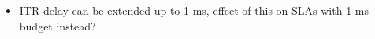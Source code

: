 \label{sec:dis}

\begin{itemize}
    \item ITR-delay can be extended up to 1 ms, effect of this on SLAs with 1 ms budget instead?
\end{itemize}